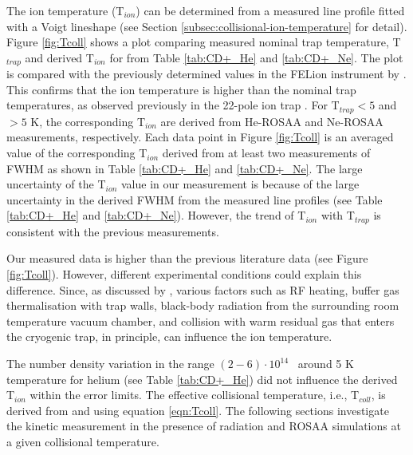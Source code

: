 The ion temperature (T$_{ion}$) can be determined from a measured line profile
fitted with a Voigt lineshape (see Section
\ref{subsec:collisional-ion-temperature} for detail). Figure \ref{fig:Tcoll}
shows a plot comparing measured nominal trap temperature, T$_{trap}$ and
derived T$_{ion}$ for \CD from Table \ref{tab:CD+_He} and \ref{tab:CD+_Ne}.
The plot is compared with the previously determined values in the FELion
instrument by \citet{kluge_state-selective_2016}. This confirms that the ion
temperature is higher than the nominal trap temperatures, as observed
previously in the 22-pole ion trap \cite{asvany_numerical_2009, otto_internal_2013, endres_incomplete_2017}. 
For T$_{trap} < 5$ and $>5$ K, the corresponding T$_{ion}$ are derived from He-ROSAA and Ne-ROSAA
measurements, respectively. Each data point in Figure \ref{fig:Tcoll} is an averaged value
of the corresponding T$_{ion}$ derived from at least two measurements of FWHM as shown in Table \ref{tab:CD+_He} 
and \ref{tab:CD+_Ne}. The large uncertainty of the T$_{ion}$ value in our measurement is because of the
large uncertainty in the derived FWHM from the measured line profiles (see Table \ref{tab:CD+_He} and \ref{tab:CD+_Ne}).
However, the trend of T$_{ion}$ with T$_{trap}$ is consistent with the previous measurements.


Our measured \Tion data is higher than the previous literature data (see Figure \ref{fig:Tcoll}). However, different experimental conditions could explain this difference. Since, as discussed by \citet{endres_incomplete_2017}, various factors such as RF heating, buffer gas thermalisation with trap walls, black-body radiation from the surrounding room temperature vacuum chamber, and collision with warm residual gas that enters the cryogenic trap, in principle, can influence the ion temperature.

The number density variation in the range $(2-6) \cdot 10^{14}$ \percc\ around 5 K temperature
for helium (see Table \ref{tab:CD+_He}) did not influence the derived T$_{ion}$
within the error limits. The effective collisional temperature, i.e., T$_{coll}$, is derived from \Ttrap
and \Tion using equation \ref{eqn:Tcoll}. The following sections
investigate the kinetic measurement in the presence of radiation and ROSAA
simulations at a given collisional temperature.


